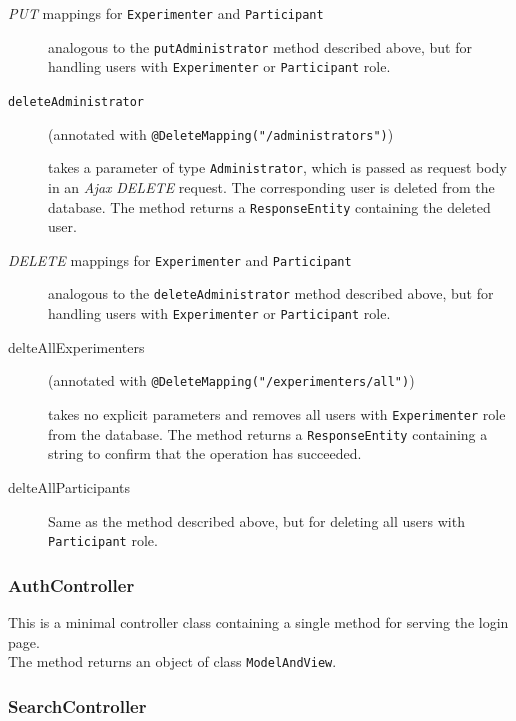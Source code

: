 \documentclass[a4paper]{usiinfbachelorproject}
\begin{document}
\begin{description}
        \item[\emph{PUT} mappings for \texttt{Experimenter} and \texttt{Participant}] analogous to  the \texttt{putAdministrator} method
        described above, but for handling users with \texttt{Experimenter} or \texttt{Participant} role.

        \item[\texttt{deleteAdministrator}]
        (annotated with \texttt{@DeleteMapping("/administrators")}) 

        takes a parameter of type \texttt{Administrator},
        which is passed as request body in an \emph{Ajax} \emph{DELETE} request. The corresponding user is
        deleted from the database. The method returns a \texttt{ResponseEntity} containing the deleted user.

        \item[\emph{DELETE} mappings for \texttt{Experimenter} and \texttt{Participant}] analogous to  the \texttt{deleteAdministrator} method
        described above, but for handling users with \texttt{Experimenter} or \texttt{Participant} role.

        \item[delteAllExperimenters] 
        (annotated with \texttt{@DeleteMapping("/experimenters/all")}) 

        takes no explicit parameters and removes all
        users with \texttt{Experimenter} role from the database. The method returns a \texttt{ResponseEntity} containing a string
        to confirm that the operation has succeeded.

        \item[delteAllParticipants]
        Same as the method described above, but for deleting all users with \texttt{Participant} role.

    \end{description}

\subsubsection{\textbf{AuthController}}

This is a minimal controller class containing a single method for serving the login page. \\ The method returns
an object of class \texttt{ModelAndView}.

\subsubsection{\textbf{SearchController}} \label{sec:archWebLayerSearch}
\end{document}
